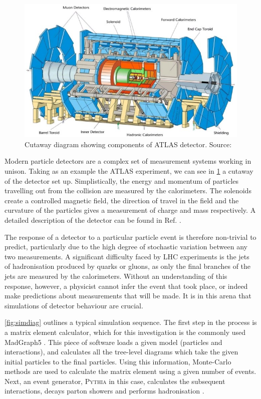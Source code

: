\documentclass{report}
\newcommand{\pkg}[1]{\textsc{#1}}
\begin{document}
\begin{figure}[H]
	\centering
	\includegraphics[width=0.8\linewidth]{atlasdetector}
	
	\caption{Cutaway diagram showing components of ATLAS detector. Source: \cite{atlaspic}}
	\label{fig:atlaspic}
	
\end{figure}


Modern particle detectors are a complex set of measurement systems working in unison. Taking as an example the ATLAS experiment, we can see in \cref{fig:atlaspic} a cutaway of the detector set up. Simplistically, the energy and momentum of particles travelling out from the collision are measured by the calorimeters. The solenoids create a controlled magnetic field, the direction of travel in the field and the curvature of the particles gives a measurement of charge and mass respectively. A detailed description of the detector can be found in Ref. \cite{armstrong}.

The response of a detector to a particular particle event is therefore non-trivial to predict, particularly due to the high degree of stochastic variation between any two measurements. A significant difficulty faced by LHC experiments is the jets of hadronisation produced by quarks or gluons, as only the final branches of the jets are measured by the calorimeters. Without an understanding of this response, however, a physicist cannot infer the event that took place, or indeed make predictions about measurements that will be made. It is in this arena that simulations of detector behaviour are crucial. 

\cref{fig:simdiag} outlines a typical simulation sequence. The first step in the process is a matrix element calculator, which for this investigation is the commonly used MadGraph5 \cite{madgraph}. This piece of software loads a given model (particles and interactions), and calculates all the tree-level diagrams which take the given initial particles to the final particles. Using this information, Monte-Carlo methods are used to calculate the matrix element using a given number of events. Next, an event generator, \pkg{Pythia} in this case, calculates the subsequent interactions, decays parton showers and performs hadronisation \cite{Gieseke2012}.
\end{document}
